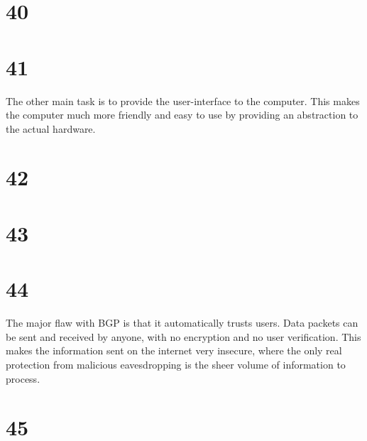 \documentclass[a4paper,11pt]{article}
\begin{document}
\section*{40}


\section*{41}
The other main task is to provide the user-interface to the computer.  This makes the computer much more friendly and easy to use by providing an abstraction to the actual hardware.  


\section*{42}


\section*{43}



\section*{44}
The major flaw with BGP is that it automatically trusts users.  Data packets can be sent and received by anyone, with no encryption and no user verification.  This makes the information sent on the internet very insecure, where the only real protection from malicious eavesdropping is the sheer volume of information to process.



\section*{45}

\end{document}
